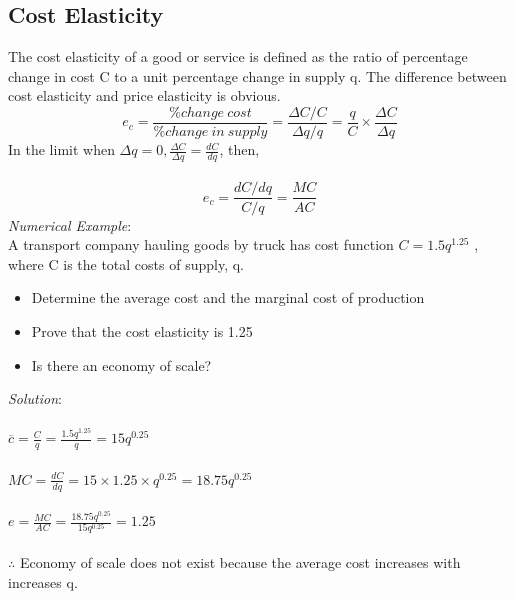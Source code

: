 \subsection{Cost Elasticity}
The cost elasticity of a good or service is defined as the ratio of percentage change in cost C to a unit percentage change in supply q. The difference between cost elasticity and price elasticity is obvious.
\begin{equation}
	e_c = \frac{\% change \: cost}{\% change \: in \: supply} = \frac{\Delta C/C}{\Delta q/q} = \frac{q}{C} \times \frac{\Delta C}{\Delta q}
\end{equation}
In the limit when $\Delta q = 0, \frac{\Delta C}{\Delta q} = \frac{dC}{dq}$, then,\\\\
\begin{equation}
	e_c = \frac{dC/dq}{C/q} = \frac{MC}{AC}
\end{equation}
\textit{Numerical Example}:\\
A transport company hauling goods by truck has cost function $ C = 1.5q^{1.25}$ , where C is the total costs of supply, q.
\begin{itemize}
	\item Determine the average cost and the marginal cost of production
	\item Prove that the cost elasticity is 1.25
	\item Is there an economy of scale?
\end{itemize}
\textit{Solution}:\\\\
$ \overline{c} = \frac{C}{q} = \frac{1.5q^{1.25}}{q} = 15q^{0.25}$\\\\
$ MC = \frac{dC}{dq} = 15 \times 1.25 \times q^{0.25} = 18.75q^{0.25}$\\\\
$ e = \frac{MC}{AC} = \frac{18.75q^{0.25}}{15q^{0.25}} = 1.25$\\\\
$\therefore$ Economy of scale does not exist because the average cost increases with increases q.
%
